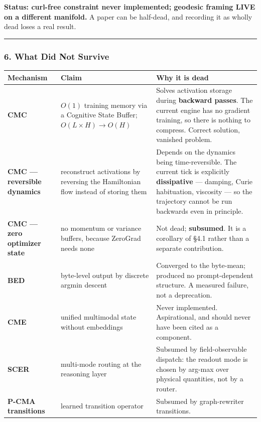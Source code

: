\documentclass[
  11pt,
  a4paper,
]{article}
\begin{document}
\textbf{Status: curl-free constraint never implemented; geodesic framing
LIVE on a different manifold.} A paper can be half-dead, and recording
it as wholly dead loses a real result.

\begin{center}\rule{0.5\linewidth}{0.5pt}\end{center}

\subsubsection{6. What Did Not Survive}\label{what-did-not-survive}

\begin{longtable}[]{@{}
  >{\raggedright\arraybackslash}p{}
  >{\raggedright\arraybackslash}p{}
  >{\raggedright\arraybackslash}p{}@{}}
\toprule\noalign{}
\begin{minipage}[b]{\linewidth}\raggedright
Mechanism
\end{minipage} & \begin{minipage}[b]{\linewidth}\raggedright
Claim
\end{minipage} & \begin{minipage}[b]{\linewidth}\raggedright
Why it is dead
\end{minipage} \\
\midrule\noalign{}
\endhead
\bottomrule\noalign{}
\endlastfoot
\textbf{CMC} & \(O(1)\) training memory via a Cognitive State Buffer;
\(O(L \times H) \to O(H)\) & Solves activation storage during
\textbf{backward passes}. The current engine has no gradient training,
so there is nothing to compress. Correct solution, vanished problem. \\
\textbf{CMC --- reversible dynamics} & reconstruct activations by
reversing the Hamiltonian flow instead of storing them & Depends on the
dynamics being time-reversible. The current tick is explicitly
\textbf{dissipative} --- damping, Curie habituation, viscosity --- so
the trajectory cannot be run backwards even in principle. \\
\textbf{CMC --- zero optimizer state} & no momentum or variance buffers,
because ZeroGrad needs none & Not dead; \textbf{subsumed}. It is a
corollary of §4.1 rather than a separate contribution. \\
\textbf{BED} & byte-level output by discrete argmin descent & Converged
to the byte-mean; produced no prompt-dependent structure. A measured
failure, not a deprecation. \\
\textbf{CME} & unified multimodal state without embeddings & Never
implemented. Aspirational, and should never have been cited as a
component. \\
\textbf{SCER} & multi-mode routing at the reasoning layer & Subsumed by
field-observable dispatch: the readout mode is chosen by arg-max over
physical quantities, not by a router. \\
\textbf{P-CMA transitions} & learned transition operator & Subsumed by
graph-rewriter transitions. \\
\end{longtable}
\end{document}
